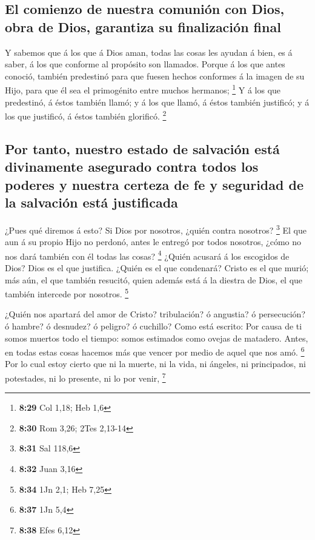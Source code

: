 \hypertarget{el-comienzo-de-nuestra-comuniuxf3n-con-dios-obra-de-dios-garantiza-su-finalizaciuxf3n-final}{%
\subsection{El comienzo de nuestra comunión con Dios, obra de Dios,
garantiza su finalización
final}\label{el-comienzo-de-nuestra-comuniuxf3n-con-dios-obra-de-dios-garantiza-su-finalizaciuxf3n-final}}

 Y sabemos que á los que á Dios aman, todas las cosas les
ayudan á bien, es á saber, á los que conforme al propósito son llamados.
 Porque á los que antes conoció, también predestinó para
que fuesen hechos conformes á la imagen de su Hijo, para que él sea el
primogénito entre muchos hermanos; \footnote{\textbf{8:29} Col 1,18; Heb
  1,6}  Y á los que predestinó, á éstos también llamó; y á
los que llamó, á éstos también justificó; y á los que justificó, á éstos
también glorificó. \footnote{\textbf{8:30} Rom 3,26; 2Tes 2,13-14}

\hypertarget{por-tanto-nuestro-estado-de-salvaciuxf3n-estuxe1-divinamente-asegurado-contra-todos-los-poderes-y-nuestra-certeza-de-fe-y-seguridad-de-la-salvaciuxf3n-estuxe1-justificada}{%
\subsection{Por tanto, nuestro estado de salvación está divinamente
asegurado contra todos los poderes y nuestra certeza de fe y seguridad
de la salvación está
justificada}\label{por-tanto-nuestro-estado-de-salvaciuxf3n-estuxe1-divinamente-asegurado-contra-todos-los-poderes-y-nuestra-certeza-de-fe-y-seguridad-de-la-salvaciuxf3n-estuxe1-justificada}}

 ¿Pues qué diremos á esto? Si Dios por nosotros, ¿quién
contra nosotros? \footnote{\textbf{8:31} Sal 118,6}  El que
aun á su propio Hijo no perdonó, antes le entregó por todos nosotros,
¿cómo no nos dará también con él todas las cosas? \footnote{\textbf{8:32}
  Juan 3,16}  ¿Quién acusará á los escogidos de Dios? Dios
es el que justifica.  ¿Quién es el que condenará? Cristo es
el que murió; más aún, el que también resucitó, quien además está á la
diestra de Dios, el que también intercede por nosotros. \footnote{\textbf{8:34}
  1Jn 2,1; Heb 7,25}

 ¿Quién nos apartará del amor de Cristo? tribulación? ó
angustia? ó persecución? ó hambre? ó desnudez? ó peligro? ó cuchillo?
 Como está escrito: Por causa de ti somos muertos todo el
tiempo: somos estimados como ovejas de matadero.  Antes, en
todas estas cosas hacemos más que vencer por medio de aquel que nos amó.
\footnote{\textbf{8:37} 1Jn 5,4}  Por lo cual estoy cierto
que ni la muerte, ni la vida, ni ángeles, ni principados, ni potestades,
ni lo presente, ni lo por venir, \footnote{\textbf{8:38} Efes 6,12}

